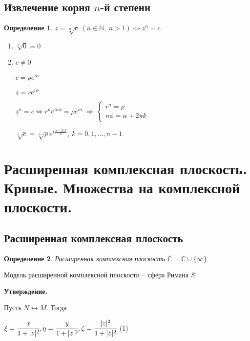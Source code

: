 \documentclass[final]{report}
\newcommand{\then}{\ \Rightarrow\ }
\renewcommand{\C}{\mathbb{C}}
\newcommand{\N}{\mathbb{N}}
\newcommand{\LRA}{\Leftrightarrow}
\renewcommand{\bar}{\overline}
\newcommand{\opr}[1]{\begin{opred}#1\end{opred}}
\newtheorem*{opred}{Определение}
\theoremstyle{remark}
\begin{document}
\subsection{Извлечение корня $n$-й степени}

\opr{$z=\sqrt[n]{c}\ (n\in\N,\ n>1)\LRA z^n=c$}
\begin{enumerate}
\item$\sqrt[n]{0}=0$
\item$c\neq0$

$c=\rho e^{i\alpha}$

$z=re^{i\phi}$

$z^n=c\LRA r^ne^{in\phi}=\rho e^{i\alpha}\then\left\{\begin{matrix}
r^n=\rho \\
n\phi=\alpha+2\pi k
\end{matrix}\right.$

$\sqrt[n]{c}=\sqrt[n]{\rho}e^{i\frac{\alpha+2\pi k}{n}},\ k=0,1,\ldots,n-1$
\end{enumerate}

\section{Расширенная комплексная плоскость. Кривые. Множества на комплексной плоскости.}

\subsection{Расширенная комплексная плоскость}

\begin{opred}
Расширенная комплексная плоскость $\bar{\C}=\C\cup\{\infty\}$
\end{opred}
Модель расширенной комплексной плоскости -- сфера Римана $S$.

{\bfseries Утверждение.}

Пусть $N\leftrightarrow M$. Тогда

$\xi=\cfrac{x}{1+|z|^2}, \eta=\cfrac{y}{1+|z|^2}, \zeta=\cfrac{|z|^2}{1+|z|^2}$ (1)
\end{document}
